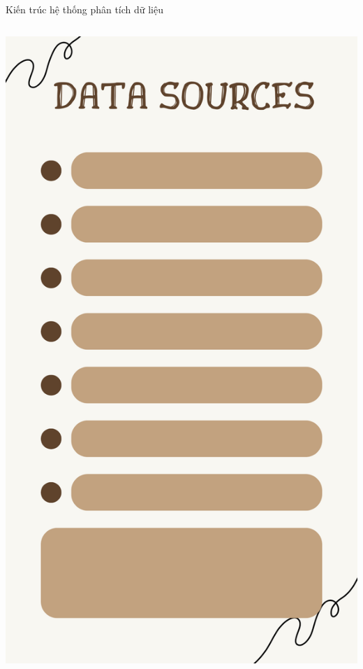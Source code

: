 \documentclass{beamer}
\begin{document}
\begin{frame}{Kiến trúc hệ thống phân tích dữ liệu}
\begin{columns}
\begin{column}{0.24\textwidth}
\includegraphics[width=\textwidth]{pictures/DATA SOURCES.png}
\end{column}


\end{columns}
\end{frame}
\end{document}
